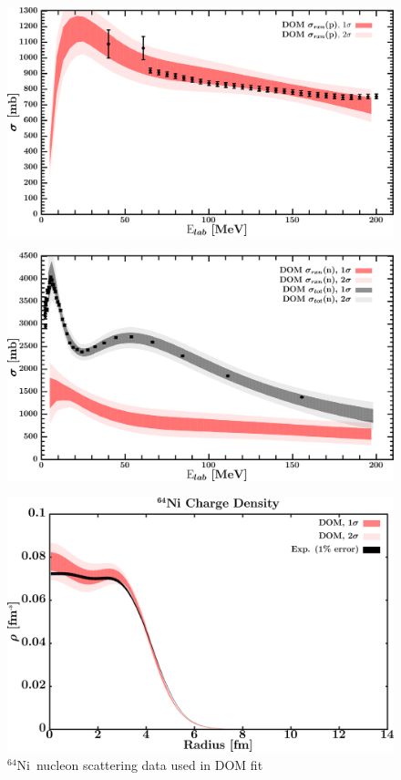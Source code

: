 \documentclass[twocolumn,secnumarabic,amssymb, nobibnotes, aps, prl,
superscriptaddress, nobalancelastpage]{revtex4}
\newcommand{\niFour}{\ensuremath{^{64}}N\lowercase{i}}
\begin{document}
\begin{figure}[!htb]
\begin{minipage}{0.4\linewidth}
        \includegraphics[width=\linewidth]{figures/ni64_protonInelastic.png}
        \label{DOM_ni64_proton_inelastic}
    \end{minipage}\hspace{6pt}
    \begin{minipage}{0.4\linewidth}
        \centering
        \includegraphics[width=\linewidth]{figures/ni64_neutronInelastic.png}
        \label{DOM_ni64_neutron_inelastic}
    \end{minipage}
    \caption{\niFour\ nucleon scattering data used in DOM fit}
    \label{DOM_ni64_scattering}
    \centering
    \begin{minipage}{0.4\linewidth}
        \centering
        \includegraphics[width=\linewidth]{figures/ni64_chargeDensity.png}

\end{minipage}
\end{figure}
\end{document}
